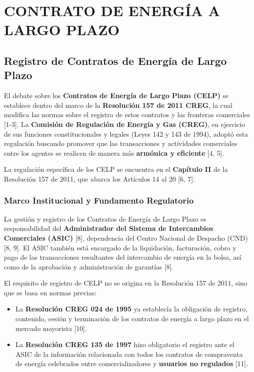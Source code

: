 \documentclass[a5paper]{book}%
\begin{document}
  
  \chapter{CONTRATO DE ENERGÍA A LARGO PLAZO}
  
  
  \section{Registro de Contratos de Energía de Largo Plazo}
  
  El debate sobre los \textbf{Contratos de Energía de Largo Plazo (CELP)} se establece dentro del marco de la \textbf{Resolución 157 de 2011 CREG}, la cual modifica las normas sobre el registro de estos contratos y las fronteras comerciales [1-3]. La \textbf{Comisión de Regulación de Energía y Gas (CREG)}, en ejercicio de sus funciones constitucionales y legales (Leyes 142 y 143 de 1994), adoptó esta regulación buscando promover que las transacciones y actividades comerciales entre los agentes se realicen de manera más \textbf{armónica y eficiente} [4, 5].
  
  La regulación específica de los CELP se encuentra en el \textbf{Capítulo II} de la Resolución 157 de 2011, que abarca los Artículos 14 al 20 [6, 7].
  
  \subsection{Marco Institucional y Fundamento Regulatorio}
  
  La gestión y registro de los Contratos de Energía de Largo Plazo es responsabilidad del \textbf{Administrador del Sistema de Intercambios Comerciales (ASIC)} [8], dependencia del Centro Nacional de Despacho (CND) [8, 9]. El ASIC también está encargado de la liquidación, facturación, cobro y pago de las transacciones resultantes del intercambio de energía en la bolsa, así como de la aprobación y administración de garantías [8].
  
  El requisito de registro de CELP no se origina en la Resolución 157 de 2011, sino que se basa en normas previas:
  \begin{itemize}
  	\item La \textbf{Resolución CREG 024 de 1995} ya establecía la obligación de registro, contenido, cesión y terminación de los contratos de energía a largo plazo en el mercado mayorista [10].
  	\item La \textbf{Resolución CREG 135 de 1997} hizo obligatorio el registro ante el ASIC de la información relacionada con todos los contratos de compraventa de energía celebrados entre comercializadores y \textbf{usuarios no regulados} [11].
  \end{itemize}
  
\end{document}
